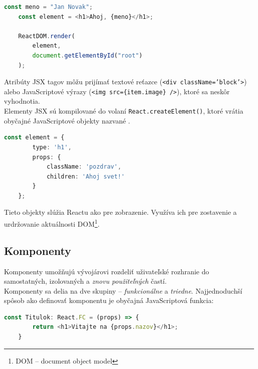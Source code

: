 \begin{lstlisting}[language=TypeScript, caption=Príklad využitia JSX v~React aplikácií. \cite{React}]
	const meno = "Jan Novak";
	const element = <h1>Ahoj, {meno}</h1>;

	ReactDOM.render(
		element,
		document.getElementById("root")
	);
\end{lstlisting}

\bigskip

\noindent Atribúty JSX tagov môžu prijímať textové reťazce (\texttt{<div className='block'>}) alebo JavaScriptové výrazy (\texttt{<img src=\{item.image\} />}), ktoré sa neskôr vyhodnotia. \\

\noindent Elementy JSX sú kompilované do volaní \texttt{React.createElement()}, ktoré vrátia obyčajné JavaScriptové objekty nazvané . \cite{React}

\bigskip

\begin{lstlisting}[language=TypeScript, caption=Príklad jednoduchého React elementu po kompilácií. \cite{React}]
	const element = {
		type: 'h1',
		props: {
			className: 'pozdrav',
			children: 'Ahoj svet!'
		}
	};
\end{lstlisting}

\bigskip

\noindent Tieto objekty slúžia Reactu ako  pre zobrazenie. Využíva ich pre zostavenie a urdržovanie aktuálnosti DOM\footnote{DOM -- document object model}. \cite{React}

\subsection{Komponenty}
\label{theory:components}
Komponenty umožňujú vývojárovi rozdeliť uživateľské rozhranie do samostatných, izolovaných a \emph{znovu použiteľných} častí. \cite{React} \\

\noindent Komponenty sa delia na dve skupiny -- \emph{funkcionálne} a \emph{triedne}. Najjednoduchší spôsob ako definovať komponentu je obyčajná JavaScriptová funkcia: \\

\begin{lstlisting}[language=TypeScript, caption=Príklad definície funkcionálnej komponenty.]
	const Titulok: React.FC = (props) => {
		return <h1>Vitajte na {props.nazov}</h1>;
	}
\end{lstlisting}

